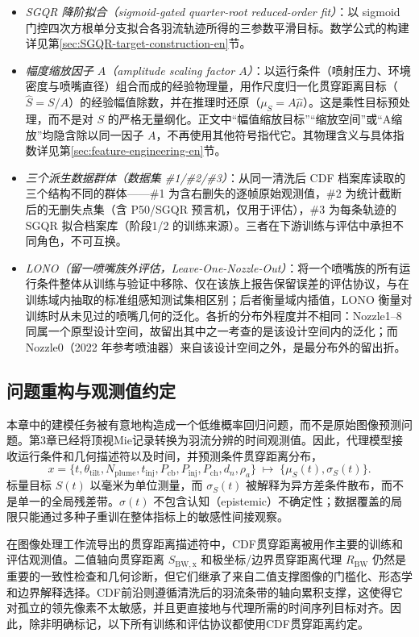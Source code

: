 \begin{itemize}
  \item \emph{SGQR 降阶拟合（sigmoid-gated quarter-root reduced-order fit）}：以 sigmoid 门控四次方根单分支拟合各羽流轨迹所得的三参数平滑目标。数学公式的构建详见第\ref{sec:SGQR-target-construction-en}节。
  \item \emph{幅度缩放因子 $A$（amplitude scaling factor $A$）}：以运行条件（喷射压力、环境密度与喷嘴直径）组合而成的经验物理量，用作尺度归一化贯穿距离目标（$\hat{S}=S/A$）的经验幅值除数，并在推理时还原（$\mu_S=A\hat{\mu}$）。这是乘性目标预处理，而不是对 \(S\) 的严格无量纲化。正文中``幅值缩放目标''``缩放空间''或``A缩放''均隐含除以同一因子 $A$，不再使用其他符号指代它。其物理含义与具体指数详见第\ref{sec:feature-engineering-en}节。
  \item \emph{三个派生数据群体（数据集 \#1/\#2/\#3）}：从同一清洗后 CDF 档案库读取的三个结构不同的群体——\#1 为含右删失的逐帧原始观测值，\#2 为统计截断后的无删失点集（含 P50/SGQR 预言机，仅用于评估），\#3 为每条轨迹的 SGQR 拟合档案库（阶段1/2 的训练来源）。三者在下游训练与评估中承担不同角色，不可互换。
  \item \emph{LONO（留一喷嘴族外评估，Leave-One-Nozzle-Out）}：将一个喷嘴族的所有运行条件整体从训练与验证中移除、仅在该族上报告保留误差的评估协议，与在训练域内抽取的标准组感知测试集相区别；后者衡量域内插值，LONO 衡量对训练时从未见过的喷嘴几何的泛化。各折的分布外程度并不相同：Nozzle1--8 同属一个原型设计空间，故留出其中之一考查的是该设计空间内的泛化；而 Nozzle0（2022 年参考喷油器）来自该设计空间之外，是最分布外的留出折。
\end{itemize}

\subsection{问题重构与观测值约定}
\label{sec:surrogate-problem-framing-en}

本章中的建模任务被有意地构造成一个低维概率回归问题，而不是原始图像预测问题。第3章已经将顶视Mie记录转换为羽流分辨的时间观测值。因此，代理模型接收运行条件和几何描述符以及时间，并预测条件贯穿距离分布，
\[
x=\{t,\theta_{\mathrm{tilt}},N_{\mathrm{plume}},t_{\mathrm{inj}},P_{\mathrm{cb}},P_{\mathrm{inj}},P_{\mathrm{ch}},d_n,\rho_a\}
\;\longmapsto\;
\{\mu_S(t),\sigma_S(t)\}.
\]
标量目标 \(S(t)\) 以毫米为单位测量，而 \(\sigma_S(t)\) 被解释为异方差条件散布，而不是单一的全局残差带。\(\sigma(t)\) 不包含认知（epistemic）不确定性；数据覆盖的局限只能通过多种子重训在整体指标上的敏感性间接观察。

在图像处理工作流导出的贯穿距离描述符中，CDF贯穿距离被用作主要的训练和评估观测值。二值轴向贯穿距离 \(S_{\mathrm{BW,x}}\) 和极坐标/边界贯穿距离代理 \(R_{\mathrm{BW}}\) 仍然是重要的一致性检查和几何诊断，但它们继承了来自二值支撑图像的门槛化、形态学和边界解释选择。CDF前沿则遵循清洗后的羽流条带的轴向累积支撑，这使得它对孤立的领先像素不太敏感，并且更直接地与代理所需的时间序列目标对齐。因此，除非明确标记，以下所有训练和评估协议都使用CDF贯穿距离约定。

